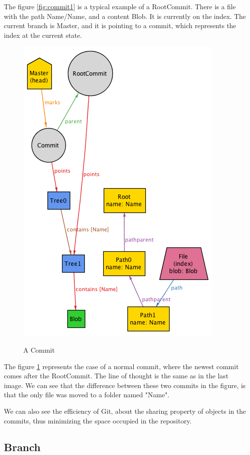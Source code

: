 The figure \ref{fig:commit1} is a typical example of a RootCommit. There is a file with the path
Name/Name, and a content Blob. It is currently on the index. The current branch
is Master, and it is pointing to a commit, which represents the index at the current
state. \par

\begin{figure} 
	\caption{A Commit}
	\centering
	\includegraphics[scale=0.65]{images/commit2.png}
	\label{fig:commit2}
\end{figure}

The figure \ref{fig:commit2} represents the case of a normal commit, where the
newest commit comes after the RootCommit. The line of thought is the same as in
the last image. We can see that the difference between these two commits in the
figure, is that the only file was moved to a folder named "Name". \par
We can also see the efficiency of Git, about the sharing property of objects in
the commits, thus minimizing the space occupied in the repository. \par
\subsection{Branch}

